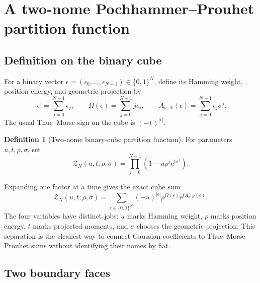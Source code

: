 \documentclass[11pt,oneside]{article}
\numberwithin{equation}{section}
\theoremstyle{definition}
\newtheorem{definition}[theorem]{Definition}
\theoremstyle{remark}
\newcommand{\e}{\mathrm e}
\newcommand{\Zpart}{\mathscr Z}
\begin{document}
\section{A two-nome Pochhammer--Prouhet partition function}
\label{sec:two-nome}

\subsection{Definition on the binary cube}

For a binary vector $\epsilon=(\epsilon_0,\ldots,\epsilon_{N-1})\in\{0,1\}^N$,
define its Hamming weight, position energy, and geometric projection by
\begin{equation}
 |\epsilon|=\sum_{j=0}^{N-1}\epsilon_j,
 \qquad
 \Omega(\epsilon)=\sum_{j=0}^{N-1}j\epsilon_j,
 \qquad
 A_{\sigma,N}(\epsilon)=\sum_{j=0}^{N-1}\epsilon_j\sigma^j.
 \label{eq:binary-statistics}
\end{equation}
The usual Thue--Morse sign on the cube is $(-1)^{|\epsilon|}$.

\begin{definition}[Two-nome binary-cube partition function]
\label{def:two-nome}
For parameters $u,t,\rho,\sigma$, set
\begin{equation}
 \boxed{
 \Zpart_N(u,t;\rho,\sigma)=
 \prod_{j=0}^{N-1}\left(1-u\rho^j\e^{t\sigma^j}\right).}
 \label{eq:Z-master}
\end{equation}
\end{definition}

Expanding one factor at a time gives the exact cube sum
\begin{equation}
 \boxed{
 \Zpart_N(u,t;\rho,\sigma)
 =\sum_{\epsilon\in\{0,1\}^N}
 (-u)^{|\epsilon|}\rho^{\Omega(\epsilon)}
 \e^{tA_{\sigma,N}(\epsilon)}.}
 \label{eq:Z-cube}
\end{equation}
The four variables have distinct jobs:
$u$ marks Hamming weight, $\rho$ marks position energy, $t$ marks projected
moments, and $\sigma$ chooses the geometric projection.  This separation is
the cleanest way to connect Gaussian coefficients to Thue--Morse Prouhet sums
without identifying their nomes by fiat.

\subsection{Two boundary faces}
\end{document}
